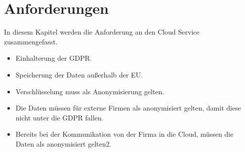 \section{Anforderungen}
In diesem Kapitel werden die Anforderung an den Cloud Service zusammengefasst.

\begin{itemize}
\item Einhalterung der GDPR.
\item Speicherung der Daten außerhalb der EU.
\item Verschlüsselung muss als Anonymisierung gelten.
\item Die Daten müssen für externe Firmen als anonymisiert gelten, damit diese nicht unter die GDPR fallen. 
\item Bereits bei der Kommunikation von der Firma in die Cloud, müssen die Daten als anonymisiert gelten2. 
\end{itemize}